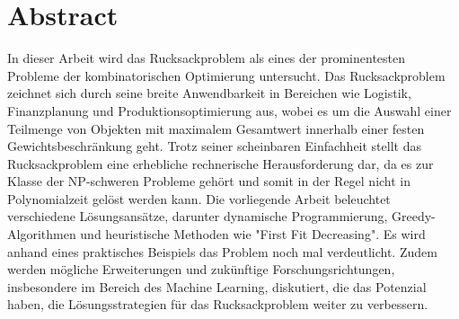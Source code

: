 \documentclass[12pt]{report}
\begin{document}
\pagestyle{plain}
\fancyhead{}


\fancyhead[C]{\nouppercase\leftmark}

\renewcommand{\footrulewidth}{0.4pt} %


\renewcommand{\sectionmark}[1]{\markboth{#1}{}} 

\newpage
\chapter*{Abstract}
In dieser Arbeit wird das Rucksackproblem als eines der prominentesten Probleme der kombinatorischen Optimierung untersucht. Das Rucksackproblem zeichnet sich durch seine breite Anwendbarkeit in Bereichen wie Logistik, Finanzplanung und Produktionsoptimierung aus, wobei es um die Auswahl einer Teilmenge von Objekten mit maximalem Gesamtwert innerhalb einer festen Gewichtsbeschränkung geht. Trotz seiner scheinbaren Einfachheit stellt das Rucksackproblem eine erhebliche rechnerische Herausforderung dar, da es zur Klasse der NP-schweren Probleme gehört und somit in der Regel nicht in Polynomialzeit gelöst werden kann. Die vorliegende Arbeit beleuchtet verschiedene Lösungsansätze, darunter dynamische Programmierung, Greedy-Algorithmen und heuristische Methoden wie "First Fit Decreasing". Es wird anhand eines praktisches Beispiels das Problem noch mal verdeutlicht. Zudem werden mögliche Erweiterungen und zukünftige Forschungsrichtungen, insbesondere im Bereich des Machine Learning, diskutiert, die das Potenzial haben, die Lösungsstrategien für das Rucksackproblem weiter zu verbessern.
\newpage
\end{document}
